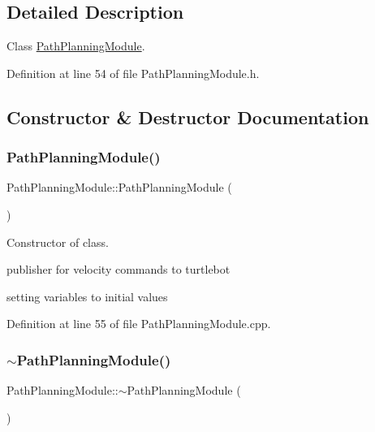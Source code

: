 \subsection{Detailed Description}
Class \mbox{\hyperlink{class_path_planning_module}{Path\+Planning\+Module}}. 

Definition at line 54 of file Path\+Planning\+Module.\+h.



\subsection{Constructor \& Destructor Documentation}
\mbox{\label{class_path_planning_module_a45510d19b199ab89cecc1bf6e8b252eb}} 
\subsubsection{\texorpdfstring{Path\+Planning\+Module()}{PathPlanningModule()}}
{\footnotesize\ttfamily Path\+Planning\+Module\+::\+Path\+Planning\+Module (\begin{DoxyParamCaption}{ }\end{DoxyParamCaption})}



Constructor of class. 

publisher for velocity commands to turtlebot

setting variables to initial values 

Definition at line 55 of file Path\+Planning\+Module.\+cpp.

\mbox{\label{class_path_planning_module_acc73ccfa18e08a1771b72bb418d96258}} 
\subsubsection{\texorpdfstring{$\sim$\+Path\+Planning\+Module()}{~PathPlanningModule()}}
{\footnotesize\ttfamily Path\+Planning\+Module\+::$\sim$\+Path\+Planning\+Module (\begin{DoxyParamCaption}{ }\end{DoxyParamCaption})}



